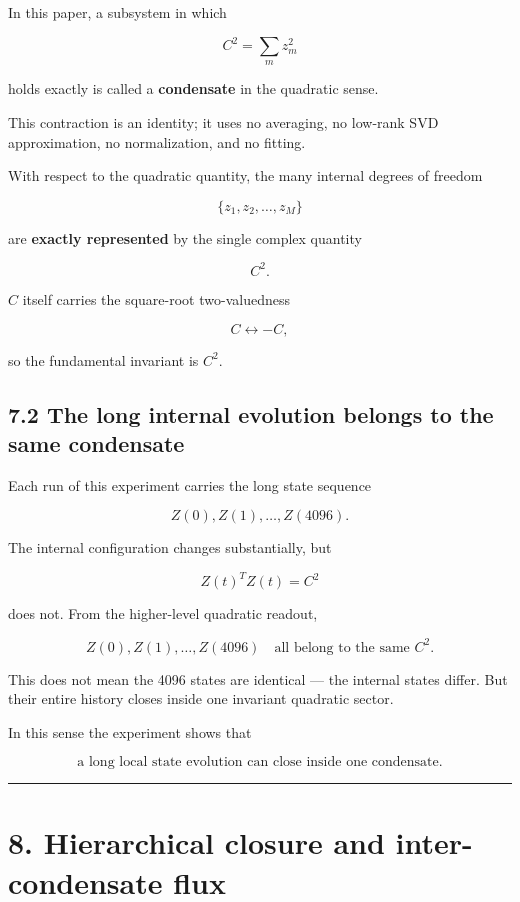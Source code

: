 \documentclass[
  a4paper,
]{article}
\begin{document}
In this paper, a subsystem in which

\[
C^2=\sum_m z_m^2
\]

holds exactly is called a \textbf{condensate} in the quadratic sense.

This contraction is an identity; it uses no averaging, no low-rank SVD
approximation, no normalization, and no fitting.

With respect to the quadratic quantity, the many internal degrees of
freedom

\[
\{z_1,z_2,\ldots,z_M\}
\]

are \textbf{exactly represented} by the single complex quantity

\[
\boxed{C^2}.
\]

\(C\) itself carries the square-root two-valuedness

\[
C\leftrightarrow -C,
\]

so the fundamental invariant is \(C^2\).

\subsection{7.2 The long internal evolution belongs to the same
condensate}\label{the-long-internal-evolution-belongs-to-the-same-condensate}

Each run of this experiment carries the long state sequence

\[
Z(0),Z(1),\ldots,Z(4096).
\]

The internal configuration changes substantially, but

\[
Z(t)^T Z(t)=C^2
\]

does not. From the higher-level quadratic readout,

\[
\boxed{
Z(0),Z(1),\ldots,Z(4096)
\quad\text{all belong to the same }C^2
}.
\]

This does not mean the 4096 states are identical --- the internal states
differ. But their entire history closes inside one invariant quadratic
sector.

In this sense the experiment shows that

\[
\boxed{
\text{a long local state evolution can close inside one condensate}
}.
\]

\begin{center}\rule{0.5\linewidth}{0.5pt}\end{center}

\section{8. Hierarchical closure and inter-condensate
flux}\label{hierarchical-closure-and-inter-condensate-flux}
\end{document}
